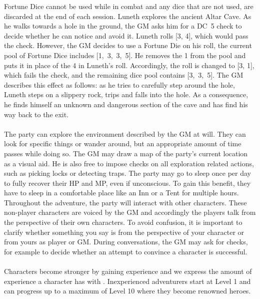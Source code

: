 Fortune Dice cannot be used while in combat and any dice that are not used, are discarded at the end of each session.
%
\ofpar
%
{
	Luneth explores the ancient Altar Cave. 
	As he walks towards a hole in the ground, the GM asks him for a DC~5 check to decide whether he can notice and avoid it.
	Luneth rolls [3, 4], which would pass the check.
	However, the GM decides to use a Fortune Die on his roll, the current pool of Fortune Dice includes \mbox{[1, 3, 3, 5]}.
	He removes the 1 from the pool and puts it in place of the 4 in Luneth's roll.  
	Accordingly, the roll is changed to [3, 1], which fails the check, and the remaining dice pool contains \mbox{[3, 3, 5]}.
	The GM describes this effect as follows: as he tries to carefully step around the hole, Luneth steps on a slippery rock, trips and falls into the hole.
	As a consequence, he finds himself an unknown and dangerous section of the cave and has find his way back to the exit.
}
%
\ofpar
%
\\\\
%
The party can explore the environment described by the GM at will.
They can look for specific things or wander around, but an appropriate amount of time passes while doing so.
The GM may draw a map of the party's current location as a visual aid. 
He is also free to impose checks on all exploration related actions, such as picking locks or detecting traps.
The party may go to sleep once per day to fully recover their HP and MP, even if unconscious.
To gain this benefit, they have to sleep in a comfortable place like an Inn or a Tent for multiple hours.
Throughout the adventure, the party will interact with other characters.
These non-player characters are voiced by the GM and accordingly the players talk from the perspective of their own characters.
To avoid confusion, it is important to clarify whether something you say is from the perspective of your character or from yours as player or GM.
During conversations, the GM may ask for checks, for example to decide whether an attempt to convince a character is successful.
%
\vfill
%
\\\\
%
Characters become stronger by gaining experience and we express the amount of experience a character has with .
Inexperienced adventurers start at Level 1 and can progress up to a maximum of Level 10 where they become renowned heroes. 
